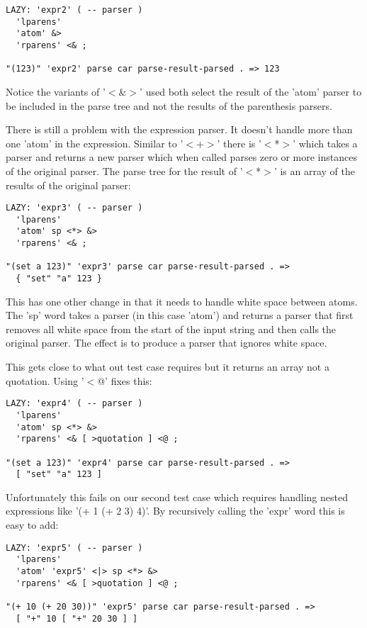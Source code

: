 \begin{verbatim}
LAZY: 'expr2' ( -- parser )
  'lparens' 
  'atom' &>
  'rparens' <& ;

"(123)" 'expr2' parse car parse-result-parsed . => 123
\end{verbatim}

Notice the variants of '$<$\&$>$' used both select the result of the 'atom'
parser to be included in the parse tree and not the results of the
parenthesis parsers.

There is still a problem with the expression parser. It doesn't handle
more than one 'atom' in the expression. Similar to '$<$+$>$' there is
'$<$*$>$' which takes a parser and returns a new parser which when called
parses zero or more instances of the original parser. The parse tree
for the result of '$<$*$>$' is an array of the results of the original
parser:

\begin{verbatim}
LAZY: 'expr3' ( -- parser )
  'lparens' 
  'atom' sp <*> &>
  'rparens' <& ;

"(set a 123)" 'expr3' parse car parse-result-parsed . => 
  { "set" "a" 123 }
\end{verbatim}

This has one other change in that it needs to handle white space
between atoms. The 'sp' word takes a parser (in this case 'atom') and
returns a parser that first removes all white space from the start of
the input string and then calls the original parser. The effect is to
produce a parser that ignores white space.

This gets close to what out test case requires but it returns an array
 not a quotation. Using '$<$@' fixes this:

\begin{verbatim}
LAZY: 'expr4' ( -- parser )
  'lparens' 
  'atom' sp <*> &>
  'rparens' <& [ >quotation ] <@ ;

"(set a 123)" 'expr4' parse car parse-result-parsed . => 
  [ "set" "a" 123 ]
\end{verbatim}

Unfortunately this fails on our second test case which requires
handling nested expressions like '(+ 1 (+ 2 3) 4)'. By recursively
calling the 'expr' word this is easy to add:

\begin{verbatim}
LAZY: 'expr5' ( -- parser )
  'lparens' 
  'atom' 'expr5' <|> sp <*> &>
  'rparens' <& [ >quotation ] <@ ;

"(+ 10 (+ 20 30))" 'expr5' parse car parse-result-parsed . => 
  [ "+" 10 [ "+" 20 30 ] ]
\end{verbatim}


